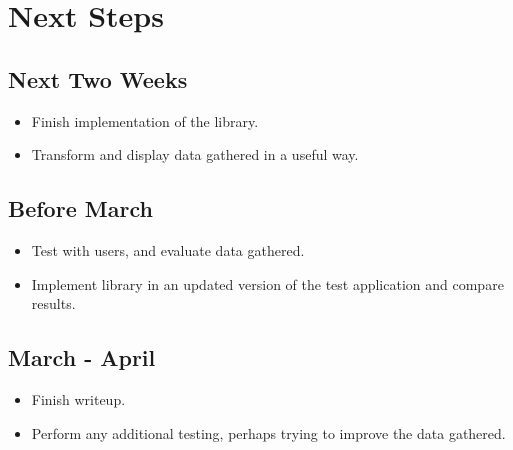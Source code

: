 \section{Next Steps}

\subsection{Next Two Weeks}
\begin{itemize}
\item
Finish implementation of the library.
\item
Transform and display data gathered in a useful way.
\end{itemize}

\subsection{Before March}
\begin{itemize}
\item
Test with users, and evaluate data gathered.
\item
Implement library in an updated version of the test application and compare results.
\end{itemize}

\subsection{March - April}
\begin{itemize}
\item
Finish writeup.
\item
Perform any additional testing, perhaps trying to improve the data gathered.
\end{itemize}

